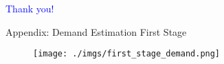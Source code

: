 \documentclass[notes,11pt, aspectratio=169]{beamer}
\begin{document}
\begin{frame}
\textcolor{blue}{\huge{\centerline{Thank you!}}}
\end{frame}

%    
%    


\appendix

\begin{frame}[label=firststage]{Appendix: Demand Estimation First Stage \hyperlink{demand}{}}
    \vspace{0.5cm}
      
        \begin{figure}[t*]
          \centering
    
          \texttt{[image: ./imgs/first\_stage\_demand.png]}
        \end{figure}
        
      \end{frame}
\end{document}
